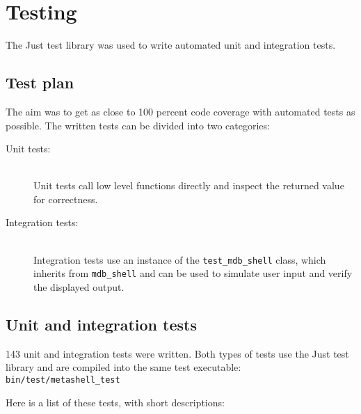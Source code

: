 
\chapter{Testing}

The Just\cite{just} test library was used to write automated unit and
integration tests.


\section{Test plan}


The aim was to get as close to 100 percent code coverage with automated tests
as possible. The written tests can be divided into two categories:

\begin{description}
    \item[Unit tests:] \hfill \\
        Unit tests call low level functions directly and inspect the returned
        value for correctness.
    \item[Integration tests:] \hfill \\
        Integration tests use an instance of the \texttt{test\_mdb\_shell}
        class, which inherits from \texttt{mdb\_shell} and can be used to
        simulate user input and verify the displayed output.
\end{description}

\section{Unit and integration tests} \label{tests}

143 unit and integration tests were written. Both types of tests use the Just
test library and are compiled into the same test executable:
\verb$bin/test/metashell_test$

Here is a list of these tests, with short descriptions:

